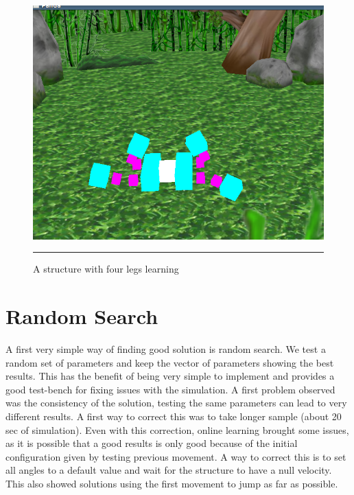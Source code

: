  
\begin{figure}[htbp]
    \centering
    \includegraphics[scale=0.5]{Figures/four_legged.png}
    \rule{35em}{0.5pt}
    \caption[A structure with four legs learning]{A structure with four legs learning}
    \label{fig:four_legged}
\end{figure}

\section{Random Search}

A first very simple way of finding good solution is random search. We test a random set of parameters and keep the vector of parameters showing the best results. This has the benefit of being very simple to implement and provides a good test-bench for fixing issues with the simulation. A first problem observed was the consistency of the solution, testing the same parameters can lead to very different results. A first way to correct this was to take longer sample (about 20 sec of simulation). Even with this correction, online learning brought some issues, as it is possible that a good results is only good because of the initial configuration given by testing previous movement. A way to correct this is to set all angles to a default value and wait for the structure to have a null velocity. This also showed solutions using the first movement to jump as far as possible. 




